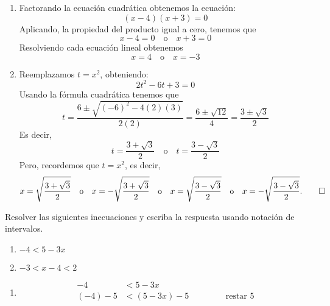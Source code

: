 \documentclass[11pt,a4]{aleph-examen}
\begin{document}
\begin{preguntas}
\begin{multicols}{2}
\begin{enumerate}[label=\textit{\alph*)}]
    \end{enumerate}
\end{multicols}
\begin{respuesta}
    \begin{enumerate}[label=\textit{\alph*)}]
        \item Factorando la ecuación cuadrática obtenemos la ecuación:
        $$
        (x-4)(x+3) = 0
        $$
        Aplicando, la propiedad del producto igual a cero, tenemos que
        $$
        x-4 = 0 \quad \text{o} \quad x+3 = 0
        $$
        Resolviendo cada ecuación lineal obtenemos
        $$
        x = 4 \quad \text{o} \quad x = -3
        $$
        \item Reemplazamos $t = x^2$, obteniendo:
        $$
        2t^2 - 6t + 3 = 0
        $$
        Usando la fórmula cuadrática tenemos que
        $$
        t = \frac{6 \pm \sqrt{(-6)^2 - 4(2)(3)}}{2(2)} = \frac{6 \pm \sqrt{12}}{4} = \frac{3 \pm \sqrt{3}}{2}
        $$
        Es decir,
        $$
        t = \frac{3 + \sqrt{3}}{2} \quad \text{o} \quad t = \frac{3 - \sqrt{3}}{2}
        $$
        Pero, recordemos que $t = x^2$, es decir,
        \[
        x = \sqrt{\frac{3 + \sqrt{3}}{2}} \quad \text{o} \quad x = - \sqrt{\frac{3 + \sqrt{3}}{2}} \quad \text{o}\quad x = \sqrt{\frac{3 - \sqrt{3}}{2}} \quad \text{o} \quad x = - \sqrt{\frac{3 - \sqrt{3}}{2}}. \qedhere
        \]
    \end{enumerate}
\end{respuesta}
\item Resolver las siguientes inecuaciones y escriba la respuesta usando notación de intervalos.
\begin{multicols}{2}
    \begin{enumerate}[label=\textit{\alph*)}]
        \item $-4 < 5 - 3x$
        \item $-3 < x-4 < 2$
    \end{enumerate}
\end{multicols}
\begin{respuesta}
    \begin{enumerate}[label=\textit{\alph*)}]
        \item 
        $$
        \begin{aligned}
            -4 &< 5 - 3x \\
            (-4) - 5 &< \left( 5 - 3x \right) - 5 
            &\hspace{1cm}& \text{ restar }5 \\

\end{aligned}$$
\end{enumerate}
\end{respuesta}
\end{preguntas}
\end{document}
